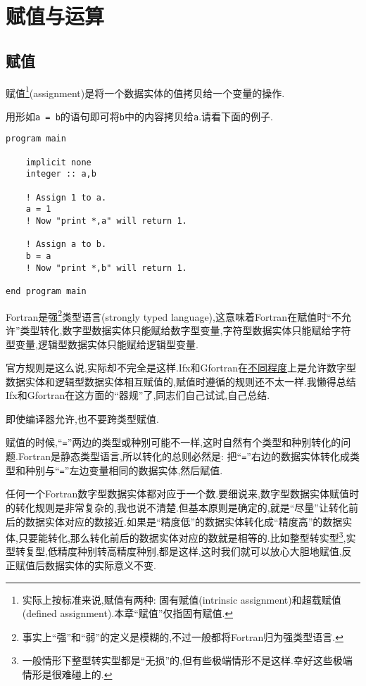 \chapter{赋值与运算}

\section{赋值}\label{fortran_assignment}

赋值\footnote{
    实际上按标准来说,赋值有两种: 固有赋值(intrinsic assignment)和超载赋值(defined assignment).本章``赋值''仅指固有赋值.
}(assignment)是将一个数据实体的值拷贝给一个变量的操作.

用形如\texttt{a = b}的语句即可将\texttt{b}中的内容拷贝给\texttt{a}.请看下面的例子.
\begin{lstlisting}
program main

    implicit none
    integer :: a,b

    ! Assign 1 to a.
    a = 1
    ! Now "print *,a" will return 1.

    ! Assign a to b.
    b = a
    ! Now "print *,b" will return 1.

end program main
\end{lstlisting}

Fortran是强\footnote{
    事实上``强''和``弱''的定义是模糊的,不过一般都将Fortran归为强类型语言.
}类型语言(strongly typed language),这意味着Fortran在赋值时``不允许''类型转化,数字型数据实体只能赋给数字型变量,字符型数据实体只能赋给字符型变量,逻辑型数据实体只能赋给逻辑型变量.

官方规则是这么说,实际却不完全是这样.Ifx和Gfortran在\uline{不同程度}上是允许数字型数据实体和逻辑型数据实体相互赋值的,赋值时遵循的规则还不太一样.我懒得总结Ifx和Gfortran在这方面的``器规''了,同志们自己试试,自己总结.

\begin{convention}
    即使编译器允许,也不要跨类型赋值.
\end{convention}

赋值的时候,``\texttt{=}''两边的类型或种别可能不一样,这时自然有个类型和种别转化的问题.Fortran是静态类型语言,所以转化的总则必然是: 把``\texttt{=}''右边的数据实体转化成类型和种别与``\texttt{=}''左边变量相同的数据实体,然后赋值.

任何一个Fortran数字型数据实体都对应于一个数.要细说来,数字型数据实体赋值时的转化规则是非常复杂的,我也说不清楚.但基本原则是确定的,就是``尽量''让转化前后的数据实体对应的数接近.如果是``精度低''的数据实体转化成``精度高''的数据实体,只要能转化,那么转化前后的数据实体对应的数就是相等的.比如整型转实型\footnote{
    一般情形下整型转实型都是``无损''的,但有些极端情形不是这样.幸好这些极端情形是很难碰上的.
},实型转复型,低精度种别转高精度种别,都是这样,这时我们就可以放心大胆地赋值,反正赋值后数据实体的实际意义不变.

